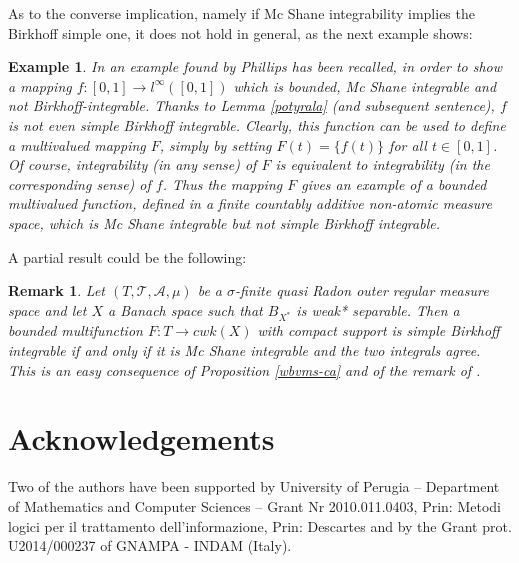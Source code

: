 \documentclass[11pt,a4paper,twoside]{amsart}
\newtheorem{remark}[theorem]{Remark}
\newtheorem{example}[theorem]{Example}
\begin{document}
As to the converse implication, namely if Mc Shane integrability implies the Birkhoff simple one, it does not hold in general, as the next example shows:
\begin{example}\label{rodriguez}\rm
In \cite[Example 2.1]{r2009b} an example found by Phillips has been recalled, in order to show a mapping $f:[0,1]\to l^{\infty}([0,1])$ which is bounded, Mc Shane integrable and not Birkhoff-integrable. Thanks to Lemma \ref{potyrala} (and subsequent sentence), $f$ is not even simple Birkhoff integrable.
Clearly, this function can be used to define a multivalued mapping $F$, simply by setting $F(t)=\{f(t)\}$ for all $t\in [0,1]$. Of course, integrability (in any sense) of $F$ is equivalent to integrability (in the corresponding sense) of $f$. Thus the mapping $F$ gives an example of a bounded multivalued function, defined in a finite countably additive non-atomic measure space, which is Mc Shane integrable but not simple Birkhoff integrable. 
\end{example}

A partial result could be the following:
\begin{remark} \rm 
Let $(T,\mathscr{T}, {{\mathcal{A}}}, \mu)$ be a 
$\sigma$-finite quasi Radon outer regular measure
space and let $X$ a Banach space such that $B_{X^*}$ is weak* separable. 
Then a bounded multifunction \mbox{$F: T \rightarrow cwk(X)$}  with compact support is simple Birkhoff integrable if and only if it is Mc Shane integrable and the two integrals agree.
This is an easy consequence of Proposition \ref{wbvms-ca} and of the remark of \cite[Corollary 4.2]{bs2012}.
\end{remark}

\section*{Acknowledgements}
Two of the authors have been supported by University of Perugia -- Department of Mathematics and Computer Sciences -- Grant Nr 2010.011.0403, 
Prin: Metodi logici per il trattamento dell'informazione,   Prin: Descartes and by the Grant prot. U2014/000237 of GNAMPA - INDAM (Italy).
\end{document}
